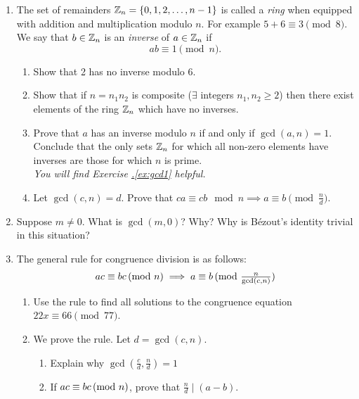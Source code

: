 \begin{exercises}{}{}
\begin{enumerate}
  \item The set of remainders $\mathbb{Z}_n=\{0,1,2,\ldots,n-1\}$ is called a \emph{ring} when equipped with addition and multiplication modulo $n$. For example $5+6\equiv 3\pmod{8}$. We say that $b\in\mathbb{Z}_n$ is an \emph{inverse} of $a\in\mathbb{Z}_n$ if
	\[ab\equiv 1\pmod n.\]
	\begin{enumerate}
	  \item Show that 2 has no inverse modulo 6.
	  \item Show that if $n=n_1n_2$ is composite ($\exists$ integers $n_1,n_2\ge 2$) then there exist elements of the ring $\mathbb{Z}_n$ which have no inverses.
	  \item Prove that $a$ has an inverse modulo $n$ if and only if $\gcd(a,n)=1$. Conclude that the only sets $\mathbb{Z}_n$ for which all non-zero elements have inverses are those for which $n$ is prime.\\
	  \emph{You will find Exercise \hyperref[ex:gcd1]{\thesubsection.\ref*{ex:gcd1}} helpful.}
	  
	  \item Let $\gcd(c,n)=d$. Prove that $ca\equiv cb\mod n\implies a\equiv b\pmod{\frac nd}$.
	\end{enumerate}
	
	
	  
		  
		
		\item\label{exs:gcd0} Suppose $m\neq 0$. What is $\gcd(m,0)$? Why? Why is Bézout's identity trivial in this situation?
		
		
		
		\item\label{exs:congdivision} The general rule for congruence division is as follows:
		\[
			ac\equiv bc\negthickspace\pmod{n} \implies a\equiv b\negthickspace\pmod{\tfrac n{\gcd(c,n)}}
		\]
		\begin{enumerate}
		  \item Use the rule to find all solutions to the congruence equation $22x\equiv 66\pmod{77}$.
		  \item We prove the rule. Let $d=\gcd(c,n)$.
		  \begin{enumerate}
		    \item Explain why $\gcd(\frac cd,\frac nd)=1$
		  	\item If $ac\equiv bc\negthickspace\pmod{n}$, prove that $\frac nd\mid(a-b)$.
			\end{enumerate}
		\end{enumerate}
% 	  
\end{enumerate}



\end{exercises}

